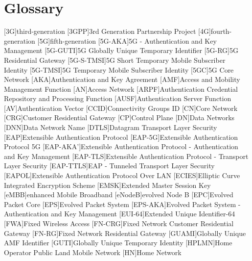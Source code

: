 \chapter{Glossary}

\footnotesize
\SingleSpacing

\begin{acronym}[AAAAAA]
[3G]{third-generation}
[3GPP]{3rd Generation Partnership Project}
[4G]{fourth-generation}
[5G]{fifth-generation}
[5G-AKA]{5G - Authentication and Key Management}
[5G-GUTI]{5G Globally Unique Temporary Identifier}
[5G-RG]{5G Residential Gateway}
[5G-S-TMSI]{5G Short Temporary Mobile Subscriber Identity}
[5G-TMSI]{5G Temporary Mobile Subscriber Identity}
[5GC]{5G Core Network}
[AKA]{Authentication and Key Agreement}
[AMF]{Access and Mobility Management Function}
[AN]{Access Network}
[ARPF]{Authentication Credential Repository and Processing Function}
[AUSF]{Authentication Server Function}
[AV]{Authentication Vector}
[CCID]{Connectivity Groups ID}
[CN]{Core Network}
[CRG]{Customer Residential Gateway}
[CP]{Control Plane}
[DN]{Data Networks}
[DNN]{Data Network Name}
[DTLS]{Datagram Transport Layer Security}
[EAP]{Extensible Authentication Protocol}
[EAP-5G]{Extensible Authentication Protocol 5G}
[EAP-AKA']{Extensible Authentication Protocol - Authentication and Key Management}
[EAP-TLS]{Extensible Authentication Protocol - Transport Layer Security}
[EAP-TTLS]{EAP - Tunneled Transport Layer Security}
[EAPOL]{Extensible Authentication Protocol Over LAN}
[ECIES]{Elliptic Curve Integrated Encryption Scheme}
[EMSK]{Extended Master Session Key}
[eMBB]{enhanced Mobile Broadband}
[eNodeB]{evolved Node B}
[EPC]{Evolved Packet Core}
[EPS]{Evolved Packet System}
[EPS-AKA]{Evolved Packet System - Authentication and Key Management}
[EUI-64]{Extended Unique Identifier-64}
[FWA]{Fixed Wireless Access}
[FN-CRG]{Fixed Network Customer Residential Gateway}
[FN-RG]{Fixed Network Residential Gateway}
[GUAMI]{Globally Unique AMF Identifier}
[GUTI]{Globally Unique Temporary Identity}
[HPLMN]{Home Operator Public Land Mobile Network}
[HN]{Home Network}

\end{acronym}
